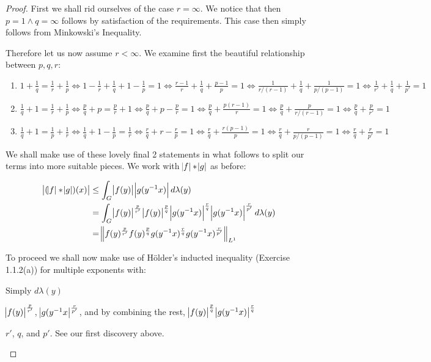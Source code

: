 \begin{proof}
First we shall rid ourselves of the case $r = \infty$. We notice that then $ p = 1 \wedge q = \infty $ follows by satisfaction of the requirements. This case then simply follows from Minkowski's Inequality.

Therefore let us now assume $ r < \infty$. We examine first the beautiful relationship between $p,q,r$:

\begin{enumerate}
\item $1+\frac{1}{q} = \frac{1}{r}+\frac{1}{p} \Leftrightarrow 1-\frac{1}{r}+\frac{1}{q}+1-\frac{1}{p} = 1 \Leftrightarrow \frac{r-1}{r}+\frac{1}{q}+\frac{p-1}{p}=1 \Leftrightarrow \frac{1}{r/(r-1)}+\frac{1}{q}+\frac{1}{p/(p-1)}=1 \Leftrightarrow \frac{1}{r'}+\frac{1}{q}+\frac{1}{p'} =1$
\item $ \frac{1}{q}+1=\frac{1}{r}+\frac{1}{p} \Leftrightarrow \frac{p}{q}+p=\frac{p}{r}+1 \Leftrightarrow \frac{p}{q}+p-\frac{p}{r}=1 \Leftrightarrow \frac{p}{q}+\frac{p(r-1)}{r}=1 \Leftrightarrow \frac{p}{q}+\frac{p}{r/(r-1)}=1 \Leftrightarrow \frac{p}{q}+\frac{p}{r'}=1$
\item $ \frac{1}{q}+1 = \frac{1}{p}+\frac{1}{r} \Leftrightarrow \frac{1}{q}+1-\frac{1}{p}=\frac{1}{r} \Leftrightarrow \frac{r}{q}+r-\frac{r}{p}=1 \Leftrightarrow \frac{r}{q}+\frac{r(p-1)}{p}=1 \Leftrightarrow \frac{r}{q}+\frac{r}{p/(p-1)}=1 \Leftrightarrow \frac{r}{q}+\frac{r}{p'}=1$
\end{enumerate}
We shall make use of these lovely final 2 statements in what follows to split our terms into more suitable pieces. We work with $\abs{f} \ast \abs{g}$ as before:

\begin{align*}
\abs{(\abs{f}\ast \abs{g})(x)} &\leq \int_G \abs{f(y)}\abs{g(y^{-1}x)} d\lambda(y) \\
&= \int_G \abs{f(y)}^\frac{p}{r'}\abs{f(y)}^\frac{p}{q}\abs{g(y^{-1}x)}^\frac{r}{q}\abs{g(y^{-1}x)}^\frac{r}{p'} d\lambda(y) \\
&= \norm{f(y)^\frac{p}{r'} f(y)^\frac{p}{q} g(y^{-1}x)^\frac{r}{q}g(y^{-1}x)^\frac{r}{p'}}_{L^1}
\end{align*}

To proceed we shall now make use of H\"older's inducted inequality (Exercise 1.1.2(a)) for multiple exponents  with:
\begin{description}
[align=right,labelwidth=3cm]
\item [Measure] Simply $d\lambda(y)$
\item [Functions] $\abs{f(y)}^\frac{p}{r'}$, $\abs{g(y^{-1}x}^\frac{r}{p'}$, and by combining the rest, $\abs{f(y)}^\frac{p}{q}\abs{g(y^{-1}x)}^\frac{r}{q}$
\item [Exponents] $r'$, $q$, and $p'$. See our first discovery above.
\end{description}



\end{proof}
